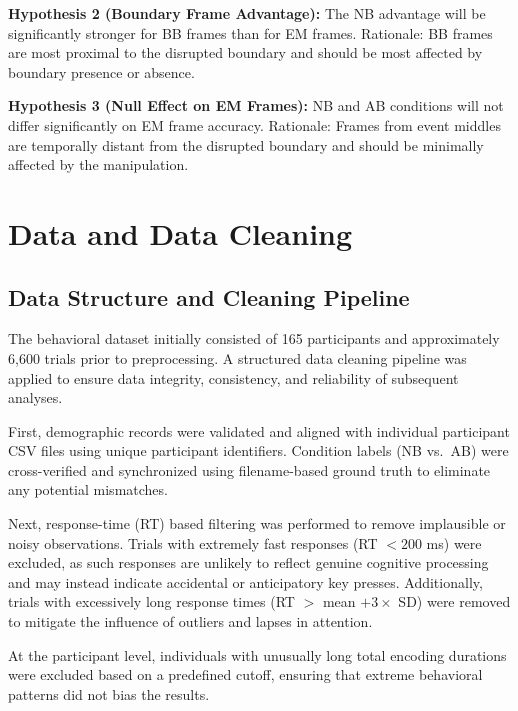 \documentclass[11pt]{article}
\begin{document}
\textbf{Hypothesis 2 (Boundary Frame Advantage):} The NB advantage will be significantly stronger for BB frames than for EM frames. Rationale: BB frames are most proximal to the disrupted boundary and should be most affected by boundary presence or absence.

\textbf{Hypothesis 3 (Null Effect on EM Frames):} NB and AB conditions will not differ significantly on EM frame accuracy. Rationale: Frames from event middles are temporally distant from the disrupted boundary and should be minimally affected by the manipulation.

\section{Data and Data Cleaning}
\subsection{Data Structure and Cleaning Pipeline}
The behavioral dataset initially consisted of 165 participants and approximately 6,600 trials prior to preprocessing. A structured data cleaning pipeline was applied to ensure data integrity, consistency, and reliability of subsequent analyses.

First, demographic records were validated and aligned with individual participant CSV files using unique participant identifiers. Condition labels (NB vs.\ AB) were cross-verified and synchronized using filename-based ground truth to eliminate any potential mismatches.

Next, response-time (RT) based filtering was performed to remove implausible or noisy observations. Trials with extremely fast responses (RT $< 200$ ms) were excluded, as such responses are unlikely to reflect genuine cognitive processing and may instead indicate accidental or anticipatory key presses. Additionally, trials with excessively long response times (RT $>$ mean $+ 3 \times$ SD) were removed to mitigate the influence of outliers and lapses in attention.

At the participant level, individuals with unusually long total encoding durations were excluded based on a predefined cutoff, ensuring that extreme behavioral patterns did not bias the results.
\end{document}
